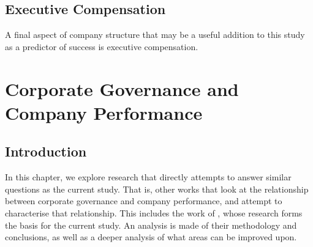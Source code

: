 \subsection {Executive Compensation}\label{execComp}
{A final aspect of company structure that may be a useful addition to this study as a predictor of success is executive compensation. }
\section{Corporate Governance and Company Performance}
\subsection{Introduction}
{In this chapter, we explore research that directly attempts to answer similar questions as the current study. That is, other works that look at the relationship between corporate governance and company performance, and attempt to characterise that relationship. This includes the work of \cite{moldovan2015learning}, whose research forms the basis for the current study. An analysis is made of their methodology and conclusions, as well as a deeper analysis of what areas can be improved upon.}
